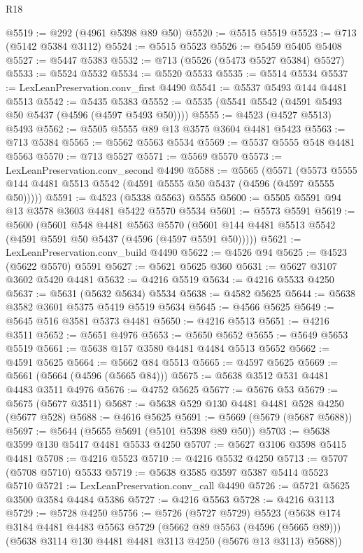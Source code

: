 \begin{lexlean}{R18}
\begin{coremodule}
@5519 := @292 (@4961 @5398 @89 @50)
@5520 := @5515 @5519
@5523 := @713 (@5142 @5384 @3112)
@5524 := @5515 @5523
@5526 := @5459 @5405 @5408
@5527 := @5447 @5383
@5532 := @713 (@5526 (@5473 @5527 @5384) @5527)
@5533 := @5524 @5532
@5534 := @5520 @5533
@5535 := @5514 @5534
@5537 := LexLeanPreservation.conv_first @4490
@5541 := @5537 @5493 @144 @4481 @5513
@5542 := @5435 @5383
@5552 := @5535 (@5541 @5542 (@4591 @5493 @50 @5437 (@4596 (@4597 @5493 @50))))
@5555 := @4523 (@4527 @5513) @5493
@5562 := @5505 @5555 @89 @13 @3575 @3604 @4481 @5423
@5563 := @713 @5384
@5565 := @5562 @5563 @5534
@5569 := @5537 @5555 @548 @4481 @5563
@5570 := @713 @5527
@5571 := @5569 @5570
@5573 := LexLeanPreservation.conv_second @4490
@5588 := @5565
    (@5571 (@5573 @5555 @144 @4481 @5513 @5542 (@4591 @5555 @50 @5437 (@4596 (@4597 @5555 @50)))))
@5591 := @4523 (@5338 @5563) @5555
@5600 := @5505 @5591 @94 @13 @3578 @3603 @4481 @5422 @5570 @5534
@5601 := @5573 @5591
@5619 := @5600
    (@5601
      @548
      @4481
      @5563
      @5570
      (@5601 @144 @4481 @5513 @5542 (@4591 @5591 @50 @5437 (@4596 (@4597 @5591 @50)))))
@5621 := LexLeanPreservation.conv_build @4490
@5622 := @4526 @94
@5625 := @4523 (@5622 @5570) @5591
@5627 := @5621 @5625 @360
@5631 := @5627 @3107 @3602 @5420 @4481
@5632 := @4216 @5519
@5634 := @4216 @5533 @4250
@5637 := @5631 (@5632 @5634) @5534
@5638 := @4582 @5625
@5644 := @5638 @3582 @3601 @5375 @5419 @5519 @5634
@5645 := @4566 @5625
@5649 := @5645 @516 @3581 @5373 @4481
@5650 := @4216 @5513
@5651 := @4216 @3511
@5652 := @5651 @4976
@5653 := @5650 @5652
@5655 := @5649 @5653 @5519
@5661 := @5638 @157 @3580 @4481 @4484 @5513 @5652
@5662 := @4591 @5625
@5664 := @5662 @84 @5513
@5665 := @4597 @5625
@5669 := @5661 (@5664 (@4596 (@5665 @84)))
@5675 := @5638 @3512 @531 @4481 @4483 @3511 @4976
@5676 := @4752 @5625
@5677 := @5676 @53
@5679 := @5675 (@5677 @3511)
@5687 := @5638 @529 @130 @4481 @4481 @528 @4250 (@5677 @528)
@5688 := @4616 @5625
@5691 := @5669 (@5679 (@5687 @5688))
@5697 := @5644 (@5655 @5691 (@5101 @5398 @89 @50))
@5703 := @5638 @3599 @130 @5417 @4481 @5533 @4250
@5707 := @5627 @3106 @3598 @5415 @4481
@5708 := @4216 @5523
@5710 := @4216 @5532 @4250
@5713 := @5707 (@5708 @5710) @5533
@5719 := @5638 @3585 @3597 @5387 @5414 @5523 @5710
@5721 := LexLeanPreservation.conv_call @4490
@5726 := @5721 @5625 @3500 @3584 @4484 @5386
@5727 := @4216 @5563
@5728 := @4216 @3113
@5729 := @5728 @4250
@5756 := @5726
    (@5727 @5729)
    @5523
    (@5638
      @174
      @3184
      @4481
      @4483
      @5563
      @5729
      (@5662 @89 @5563 (@4596 (@5665 @89)))
      (@5638 @3114 @130 @4481 @4481 @3113 @4250 (@5676 @13 @3113) @5688))

\end{coremodule}
\end{lexlean}
